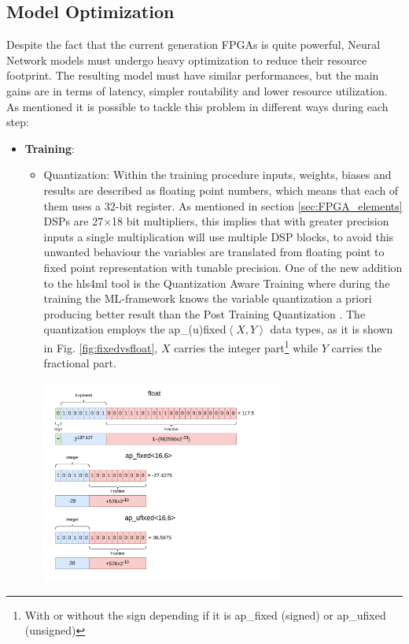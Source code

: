 \documentclass[../../main.tex]{subfiles}
\begin{document}
    
\subsection{Model Optimization}
\label{sec:FPGA_opt}
Despite the fact that the current generation FPGAs is quite powerful, Neural Network models must undergo heavy optimization to reduce their resource footprint. The resulting model must have similar performances, but the main gains are in terms of latency, simpler routability and lower resource utilization. As mentioned it is possible to tackle this problem in different ways during each step:  
\begin{itemize} 
    \item \textbf{Training}:
    \begin{itemize}
        \item Quantization: Within the training procedure inputs, weights, biases and results are described as floating point numbers, which means that each of them uses a 32-bit register. As mentioned in section \ref{sec:FPGA_elements} DSPs are 27$\times$18 bit multipliers, this implies that with greater precision inputs a single multiplication will use multiple DSP blocks, to avoid this unwanted behaviour the variables are translated from floating point to fixed point representation with tunable precision. One of the new addition to the hls4ml tool is the Quantization Aware Training where during the training the ML-framework knows the variable quantization a priori producing better result than the Post Training Quantization \cite{qkeras}. The quantization employs the ap\_(u)fixed$\left<X,Y\right>$ data types, as it is shown in Fig. \ref{fig:fixedvsfloat}, $X$ carries the integer part\footnote{With or without the sign depending if it is ap\_fixed (signed) or ap\_ufixed (unsigned)} while $Y$ carries the fractional part.
        
        \begin{minipage}{\linewidth}
            \centering
            \includegraphics[width=8cm]{sections/04/Images/FPGA-data_format.pdf}
            \label{fig:fixedvsfloat}
        \end{minipage}
        

\end{itemize}
\end{itemize}
\end{document}
